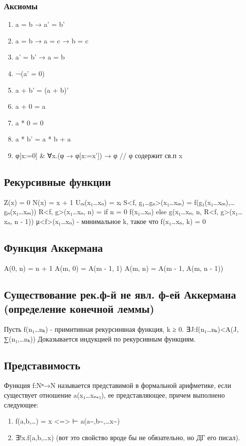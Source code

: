 \documentclass[11pt]{article}
\begin{document}
\subsubsection{Аксиомы}
\label{sec-2-20-1}
\begin{enumerate}
\item a = b → a' = b'
\item a = b → a = c → b = c
\item a' = b' → a = b
\item ¬(a' = 0)
\item a + b' = (a + b)'
\item a + 0 = a
\item a * 0 = 0
\item a * b' = a * b + a
\item φ[x:=0] \& ∀x.(φ → φ[x:=x']) → φ // φ содержит св.п x
\end{enumerate}
\subsection{Рекурсивные функции}
\label{sec-2-21}
Z(x) = 0
N(x) = x + 1
Uₙᵢ(x₁\ldots{}xₙ) = xᵢ
S<f, g₁\ldots{}gₙ>(x₁\ldots{}xₘ) = f(g₁(x₁\ldots{}xₘ),\ldots{}gₙ(x₁\ldots{}xₘ))
R<f, g>(x₁\ldots{}xₙ, n) = if n = 0
f(x₁\ldots{}xₙ)
else g(x₁\ldots{}xₙ, n, R<f, g>(x₁\ldots{}xₙ, n - 1))
μ<f>(x₁\ldots{}xₙ) - минимальное k, такое что f(x₁\ldots{}xₙ, k) = 0
\subsection{Функция Аккермана}
\label{sec-2-22}
A(0, n) = n + 1
A(m, 0) = A(m - 1, 1)
A(m, n) = A(m - 1, A(m, n - 1))
\subsection{Существование рек.ф-й не явл. ф-ей Аккермана (определение конечной леммы)}
\label{sec-2-23}
Пусть f(n₁\ldots{}nₖ) - примитивная рекурсинвная функция, k ≥ 0.
∃J:f(n₁\ldots{}nₖ)<A(J, ∑(n₁,\ldots{}nₖ))
Доказывается индукцией по рекурсивным функциям.
\subsection{Представимость}
\label{sec-2-24}
Функция f:Nⁿ→N называется представимой в формальной арифметике, если
существует отношение a(x₁\ldots{}xₙ₊₁), ее представляющее, причем выполнено
следующее:
\begin{enumerate}
\item f(a,b,\ldots{}) = x <=> ⊢ a(a\textasciitilde{},b\textasciitilde{},\ldots{}x\textasciitilde{})
\item ∃!x.f(a,b,\ldots{}x) (вот это свойство вроде бы не обязательно, но ДГ его писал).
\end{enumerate}
\end{document}

